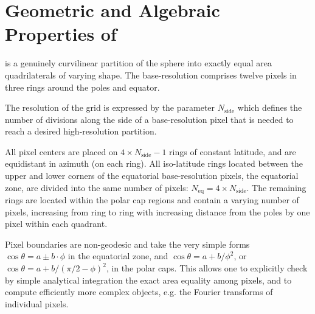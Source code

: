 \documentclass[12pt,twoside]{article}
\newcommand{\nside}{N_{\mathrm{side}}}
\begin{document}
\section{Geometric and Algebraic Properties of \healpix}

\healpix is a genuinely curvilinear partition of the sphere into exactly equal area
quadrilaterals of varying shape. The base-resolution comprises twelve pixels in three
rings around the poles and equator. 

The resolution of the grid is expressed by the parameter $\nside$ which defines the number
of divisions along the side of a base-resolution pixel that is needed to reach a desired
high-resolution partition.

All pixel centers are placed on $ 4\times \nside-1$ 
rings of constant latitude, 
and are equidistant in azimuth
(on each ring). All iso-latitude rings located between the upper and lower corners of
the equatorial base-resolution pixels, the equatorial zone, 
are divided into the same number of pixels: 
$N_{\mathrm{eq}}= 4\times \nside$. The remaining rings are located within the
polar cap regions and contain a varying number of pixels, increasing 
from ring to ring with increasing distance
from the poles by one pixel within each quadrant. 

Pixel boundaries are non-geodesic and take the very simple 
forms $\cos \theta = a \pm b \cdot \phi  $ in the equatorial zone, 
and $\cos \theta = a + b / \phi^2  $, or
  $\cos \theta = a + b / (\pi/2 - \phi) ^2  $,
in the polar caps. 
This allows one to explicitly check by simple analytical integration the 
exact area equality among pixels,
and to compute efficiently more complex objects, 
e.g. the Fourier transforms of individual pixels.
\end{document}
